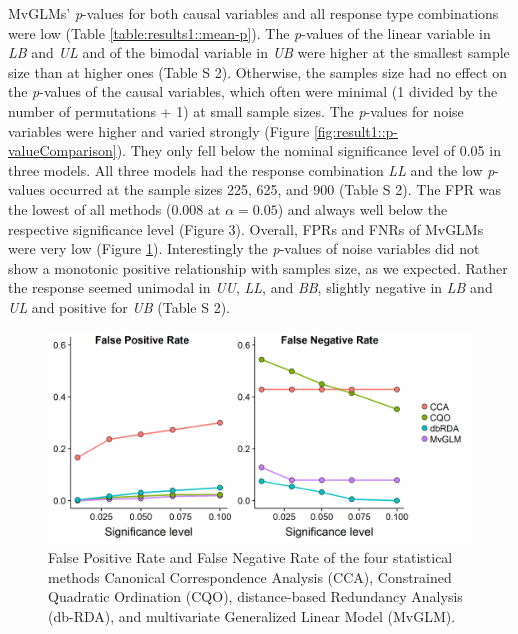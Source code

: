 \documentclass[a4paper,11pt]{article}
\begin{document}
		MvGLMs' \textit{p}-values for both causal variables and all response type combinations were low (Table  \ref{table:results1::mean-p}).
        The \textit{p}-values of the linear variable in \textit{LB} and \textit{UL} and of the bimodal variable in \textit{UB} were higher at the smallest sample size than at higher ones (Table S 2).  
		Otherwise, the samples size had no effect on the \textit{p}-values of the causal variables, which often were minimal (1 divided by the number of permutations + 1) at small sample sizes.
		The \textit{p}-values for noise variables were higher and varied strongly (Figure \ref{fig:result1::p-valueComparison}).
		They only fell below the nominal significance level of 0.05 in three models. 
		All three models had the response combination \textit{LL} and the low \textit{p}-values occurred at the sample sizes 225, 625, and 900 (Table S 2).
		The FPR was the lowest of all methods (0.008 at $\alpha = 0.05$) and always well below the respective significance level (Figure 3). 
		Overall, FPRs and FNRs of MvGLMs were very low (Figure \ref{fig:FPNR}).
        Interestingly the \textit{p}-values of noise variables did not show a monotonic positive relationship with samples size, as we expected. 
        Rather the response seemed unimodal in \textit{UU}, \textit{LL}, and \textit{BB}, slightly negative in \textit{LB} and \textit{UL} and positive for \textit{UB} (Table S 2). \\ 
        
        \begin{figure}[h]
            \centering
            \includegraphics[scale = 0.7]{figures/FPNR.png}
            \caption{False Positive Rate and False Negative Rate of the four statistical methods Canonical Correspondence Analysis (CCA), Constrained Quadratic Ordination (CQO), distance-based Redundancy Analysis (db-RDA), and multivariate Generalized Linear Model (MvGLM). }
            \label{fig:FPNR}
        \end{figure}{}
                    
\end{document}
